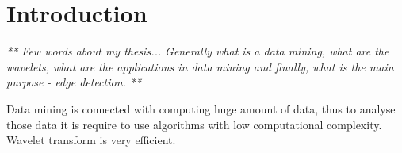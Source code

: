 \chapter*{Introduction}

\textit{ ** Few words about my thesis...
Generally what is a data mining, what are the wavelets, what are the applications in data mining and finally, what is the main purpose - edge detection. **}

Data mining is connected with computing huge amount of data, thus to analyse those data it is require to use algorithms with low computational complexity. Wavelet transform is very efficient.


%	
%
%
%
%
%
%
%
